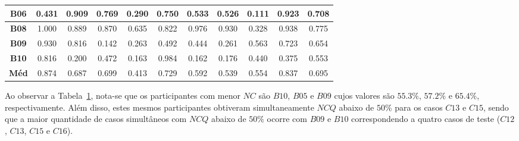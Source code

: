 \begin{table}[htbp]
\begin{tabular}{|c|ccccccccc|c|}
		\textbf{B06} & \multicolumn{1}{c|}{0.431} & \multicolumn{1}{c|}{0.909} & \multicolumn{1}{c|}{0.769} & \multicolumn{1}{c|}{0.290} & \multicolumn{1}{c|}{0.750} & \multicolumn{1}{c|}{0.533} & \multicolumn{1}{c|}{0.526} & \multicolumn{1}{c|}{0.111} & 0.923 & 0.708 \\ \hline
		\rowcolor[HTML]{F2F2F2} 
		\textbf{B08} & \multicolumn{1}{c|}{\cellcolor[HTML]{F2F2F2}1.000} & \multicolumn{1}{c|}{\cellcolor[HTML]{F2F2F2}0.889} & \multicolumn{1}{c|}{\cellcolor[HTML]{F2F2F2}0.870} & \multicolumn{1}{c|}{\cellcolor[HTML]{F2F2F2}0.635} & \multicolumn{1}{c|}{\cellcolor[HTML]{F2F2F2}0.822} & \multicolumn{1}{c|}{\cellcolor[HTML]{F2F2F2}0.976} & \multicolumn{1}{c|}{\cellcolor[HTML]{F2F2F2}0.930} & \multicolumn{1}{c|}{\cellcolor[HTML]{F2F2F2}0.328} & 0.938 & 0.775 \\ \hline
		\textbf{B09} & \multicolumn{1}{c|}{0.930} & \multicolumn{1}{c|}{0.816} & \multicolumn{1}{c|}{0.142} & \multicolumn{1}{c|}{0.263} & \multicolumn{1}{c|}{0.492} & \multicolumn{1}{c|}{0.444} & \multicolumn{1}{c|}{0.261} & \multicolumn{1}{c|}{0.563} & 0.723 & 0.654 \\ \hline
		\rowcolor[HTML]{F2F2F2} 
		\textbf{B10} & \multicolumn{1}{c|}{\cellcolor[HTML]{F2F2F2}0.816} & \multicolumn{1}{c|}{\cellcolor[HTML]{F2F2F2}0.200} & \multicolumn{1}{c|}{\cellcolor[HTML]{F2F2F2}0.472} & \multicolumn{1}{c|}{\cellcolor[HTML]{F2F2F2}0.163} & \multicolumn{1}{c|}{\cellcolor[HTML]{F2F2F2}0.984} & \multicolumn{1}{c|}{\cellcolor[HTML]{F2F2F2}0.162} & \multicolumn{1}{c|}{\cellcolor[HTML]{F2F2F2}0.176} & \multicolumn{1}{c|}{\cellcolor[HTML]{F2F2F2}0.440} & 0.375 & 0.553 \\ \hline
		\cellcolor[HTML]{F2F2F2}\textbf{Méd} & \multicolumn{1}{c|}{0.874} & \multicolumn{1}{c|}{0.687} & \multicolumn{1}{c|}{0.699} & \multicolumn{1}{c|}{0.413} & \multicolumn{1}{c|}{0.729} & \multicolumn{1}{c|}{0.592} & \multicolumn{1}{c|}{0.539} & \multicolumn{1}{c|}{0.554} & 0.837 & 0.695 \\ \hline
	\end{tabular}
	\label{tab:F3_A2_NCQ_EV1_2}
\end{table}

Ao observar a Tabela~\ref{tab:F3_A2_NCQ_EV1_2}, nota-se que os participantes com menor $NC$ são $B10$, $B05$ e $B09$ cujos valores são $55.3\%$, $57.2\%$ e $65.4\%$, respectivamente. Além disso, estes mesmos participantes obtiveram simultaneamente $NCQ$ abaixo de $50\%$ para os casos $C13$ e $C15$, sendo que a maior quantidade de casos simultâneos com $NCQ$ abaixo de $50\%$ ocorre com $B09$ e $B10$ correspondendo a quatro casos de teste ($C12$, $C13$, $C15$ e $C16$).

